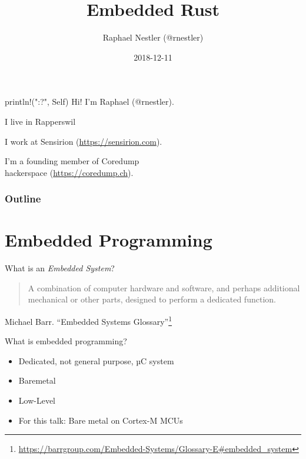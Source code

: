 \documentclass[aspectratio=1610,14pt,t]{beamer}
\title{Embedded Rust}
\date{2018-12-11}
\author{Raphael Nestler (@rnestler)}
\institute{Rust Zürichsee Meetup}
\begin{document}
\pagecolor{almostwhite}  %
\maketitle


\begin{frame}[c]{println!("{:?}", Self)}
  Hi! I'm Raphael (@rnestler).

  \pause I live in Rapperswil

  \pause I work at Sensirion ({\small \url{https://sensirion.com}}).

  \pause I'm a founding member of Coredump\\hackerspace ({\small \url{https://coredump.ch}}).
\end{frame}


\begin{frame}
  \frametitle{Outline}
  \setcounter{tocdepth}{1}
  \tableofcontents
\end{frame}



\section{Embedded Programming}

\begin{frame}[c]{What is an \emph{Embedded System}?}
  \begin{quote}
    A combination of computer hardware and software, and perhaps
    additional mechanical or other parts, designed to perform a dedicated
    function.
  \end{quote}
  Michael Barr. ``Embedded Systems Glossary''\footnote{\tiny\url{https://barrgroup.com/Embedded-Systems/Glossary-E\#embedded\_system}}
\end{frame}

\begin{frame}[c]{What is embedded programming?}
  \begin{itemize}
    \item Dedicated, not general purpose, µC system
    \item<1-> Baremetal
    \item<1-> Low-Level
    \item<2-> For this talk: Bare metal on Cortex-M MCUs
  \end{itemize}
\end{frame}
\end{document}
